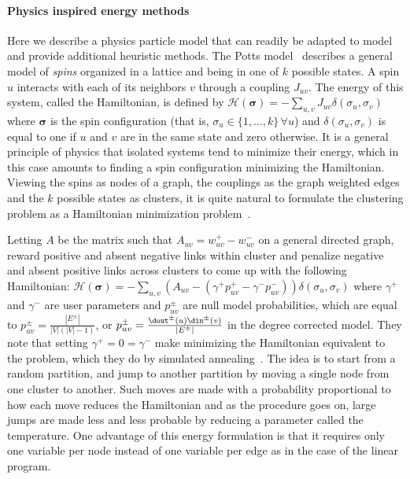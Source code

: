 \paragraph{Physics inspired energy methods}
\label{par:cc_physics}

Here we describe a physics particle model that can readily be adapted to model \pcc{} and provide
additional heuristic methods.
The Potts model~\autocite{PottsSurvey82} describes a general model of \emph{spins} organized in a
lattice and being in one of $k$ possible states. A spin $u$ interacts with each of its neighbors $v$
through a coupling $J_{uv}$. The energy of this system, called the Hamiltonian, is defined by
$\mathcal{H}(\bm{\sigma}) = -\sum_{u,v} J_{uv} \delta(\sigma_u, \sigma_v)$ where $\bm{\sigma}$ is
the spin configuration (that is, $\sigma_u \in \{1,\ldots,k\}\,\forall u$) and $\delta(\sigma_u,
\sigma_v)$ is equal to one if $u$ and $v$ are in the same state and zero otherwise. It is a general
principle of physics that isolated systems tend to minimize their energy, which in this case amounts
to finding a spin configuration minimizing the Hamiltonian. Viewing the spins as nodes of a graph,
the couplings as the graph weighted edges and the $k$ possible states as clusters, it is quite
natural to formulate the clustering problem as a Hamiltonian minimization
problem~\autocite{CommunityPhysics06}.

Letting $A$ be the matrix such that $A_{uv} = w_{uv}^+ -
w_{uv}^-$ on a general directed graph, \textcite{Traag2009} reward positive and absent negative
links within cluster and penalize negative and absent positive links across clusters to come up with
the following Hamiltonian: $\mathcal{H}(\bm{\sigma}) = -\sum_{u,v} \left(A_{uv}-(\gamma^+p^+_{uv} -
\gamma^-p^-_{uv})\right) \delta(\sigma_u, \sigma_v)$ where $\gamma^+$ and $\gamma^-$ are user
parameters and $p^\pm_{uv}$ are null model probabilities, which are equal to $p^\pm_{uv} =
\frac{|E^\pm|}{|V|(|V|-1)}$, or $p^\pm_{uv}=\frac{\dout^\pm(u) \din^\pm(v)}{|E^\pm|}$ in the degree
corrected model. They note that setting $\gamma^+ = 0 = \gamma^-$ make minimizing the Hamiltonian
equivalent to the \mind{} problem, which they do by simulated
annealing~\autocite{SimulatedAnnealing83}. The idea is to start from a random partition, and jump to
another partition by moving a single node from one cluster to another. Such moves are made with a
probability proportional to how each move reduces the Hamiltonian and as the procedure goes on, large
jumps are made less and less probable by reducing a parameter called the temperature.
One advantage of this energy formulation is that it requires only one variable per node instead of
one variable per edge as in the case of the linear program.

